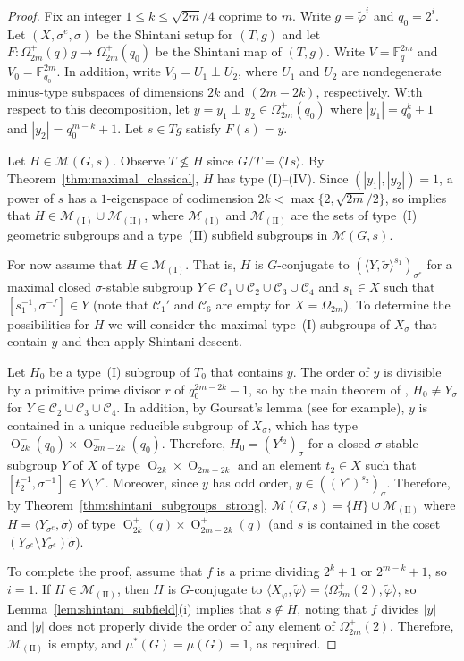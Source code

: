 \documentclass[11pt]{article}
\numberwithin{equation}{section}
\theoremstyle{shdefinition}
\theoremstyle{shplain}
\newcommand{\p}{\varphi}
\renewcommand{\wp}{\widetilde{\varphi}}
\newcommand{\s}{\sigma}
\newcommand{\ws}{\widetilde{\sigma}}
\newcommand{\C}{\mathcal{C}}
\newcommand{\M}{\mathcal{M}}
\newcommand{\<}{\langle}
\renewcommand{\>}{\rangle}
\renewcommand{\leq}{\leqslant}
\newcommand{\F}{\mathbb{F}}
\renewcommand{\:}{\colon}
\newcommand{\Om}{\Omega}
\renewcommand{\O}{\operatorname{O}}
\begin{document}
\begin{proof}
Fix an integer $1 \leq k \leq \sqrt{2m}/4$ coprime to $m$. Write $g = \wp^i$ and $q_0 = 2^i$. Let $(X,\s^e,\s)$ be the Shintani setup for $(T,g)$ and let $F\:\Om^+_{2m}(q)g \to \Om^+_{2m}(q_0)$ be the Shintani map of $(T,g)$. Write $V = \F_q^{2m}$ and $V_0 = \F_{q_0}^{2m}$. In addition, write $V_0 = U_1 \perp U_2$, where $U_1$ and $U_2$ are nondegenerate minus-type subspaces of dimensions $2k$ and $(2m-2k)$, respectively. With respect to this decomposition, let $y = y_1 \perp y_2 \in \Om^+_{2m}(q_0)$ where $|y_1| = q_0^k+1$ and $|y_2| = q_0^{m-k}+1$. Let $s \in Tg$ satisfy $F(s) = y$.

Let $H \in \M(G,s)$. Observe $T \not\leq H$ since $G/T = \<Ts\>$. By Theorem~\ref{thm:maximal_classical}, $H$ has type (I)--(IV). Since $(|y_1|,|y_2|)=1$, a power of $s$ has a $1$-eigenspace of codimension $2k < \max\{2,\sqrt{2m}/2\}$, so \cite[Theorem~7.1]{ref:GuralnickSaxl03} implies that $H \in \M_{\mathrm{(I)}} \cup \M_{\mathrm{(II)}}$, where $\M_{\mathrm{(I)}}$ and $\M_{\mathrm{(II)}}$ are the sets of type~(I) geometric subgroups and a type~(II) subfield subgroups in $\M(G,s)$.

For now assume that $H \in \M_{\mathrm{(I)}}$. That is, $H$ is $G$-conjugate to $(\<Y, \ws\>^{s_1})_{\s^e}$ for a maximal closed $\s$-stable subgroup $Y \in \C_1 \cup \C_2 \cup \C_3 \cup \C_4$ and $s_1 \in X$ such that $[s_1^{-1},\s^{-f}] \in Y$ (note that $\C_1'$ and $\C_6$ are empty for $X = \Omega_{2m}$). To determine the possibilities for $H$ we will consider the maximal type~(I) subgroups of $X_\s$ that contain $y$ and then apply Shintani descent. 

Let $H_0$ be a type~(I) subgroup of $T_0$ that contains $y$. The order of $y$ is divisible by a primitive prime divisor $r$ of $q_0^{2m-2k}-1$, so by the main theorem of \cite{ref:GuralnickPenttilaPraegerSaxl97}, $H_0 \neq Y_\s$ for $Y \in \C_2 \cup \C_3 \cup \C_4$. In addition, by Goursat's lemma (see \cite[Lemma~2.3.1]{ref:Harper} for example), $y$ is contained in a unique reducible subgroup of $X_\s$, which has type $\O^-_{2k}(q_0) \times \O^-_{2m-2k}(q_0)$. Therefore, $H_0 = (Y^{t_2})_\s$ for a closed $\s$-stable subgroup $Y$ of $X$ of type ${\O_{2k}} \times {\O_{2m-2k}}$ and an element $t_2 \in X$ such that $[t_2^{-1},\s^{-1}] \in Y \setminus Y^\circ$. Moreover, since $y$ has odd order, $y \in ((Y^\circ)^{s_2})_\s$. Therefore, by Theorem~\ref{thm:shintani_subgroups_strong}, $\M(G,s) = \{ H \} \cup \M_{\mathrm{(II)}}$ where $H = \< Y_{\s^e}, \ws\>$ of type $\O^+_{2k}(q) \times \O^+_{2m-2k}(q)$ (and $s$ is contained in the coset $(Y_{\s^e} \setminus Y^\circ_{\s^e})\ws$).

To complete the proof, assume that $f$ is a prime dividing $2^k+1$ or $2^{m-k}+1$, so $i=1$. If $H \in \M_{\mathrm{(II)}}$, then $H$ is $G$-conjugate to $\< X_\p, \wp \> = \< \Om^+_{2m}(2), \wp \>$, so Lemma~\ref{lem:shintani_subfield}(i) implies that $s \not\in H$, noting that $f$ divides $|y|$ and $|y|$ does not properly divide the order of any element of $\Om^+_{2m}(2)$. Therefore, $\M_{\mathrm{(II)}}$ is empty, and $\mu^*(G) = \mu(G) = 1$, as required.
\end{proof}
\end{document}

